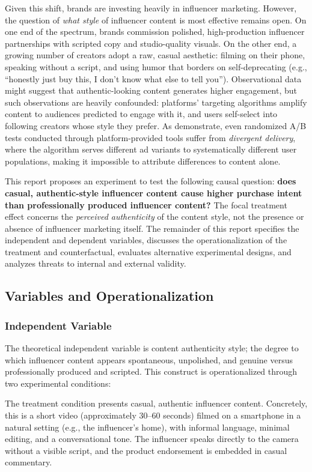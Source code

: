 \documentclass[10pt]{article}
\begin{document}
Given this shift, brands are investing heavily in influencer marketing. However, the question of \textit{what style} of influencer content is most effective remains open. On one end of the spectrum, brands commission polished, high-production influencer partnerships with scripted copy and studio-quality visuals. On the other end, a growing number of creators adopt a raw, casual aesthetic: filming on their phone, speaking without a script, and using humor that borders on self-deprecating (e.g., ``honestly just buy this, I don't know what else to tell you''). Observational data might suggest that authentic-looking content generates higher engagement, but such observations are heavily confounded: platforms' targeting algorithms amplify content to audiences predicted to engage with it, and users self-select into following creators whose style they prefer. As \textcite{braun2025abtesting} demonstrate, even randomized A/B tests conducted through platform-provided tools suffer from \textit{divergent delivery}, where the algorithm serves different ad variants to systematically different user populations, making it impossible to attribute differences to content alone.

This report proposes an experiment to test the following causal question: \textbf{does casual, authentic-style influencer content cause higher purchase intent than professionally produced influencer content?} The focal treatment effect concerns the \textit{perceived authenticity} of the content style, not the presence or absence of influencer marketing itself. The remainder of this report specifies the independent and dependent variables, discusses the operationalization of the treatment and counterfactual, evaluates alternative experimental designs, and analyzes threats to internal and external validity.

\subsection{Variables and Operationalization}
\subsubsection{Independent Variable}
The theoretical independent variable is content authenticity style; the degree to which influencer content appears spontaneous, unpolished, and genuine versus professionally produced and scripted. This construct is operationalized through two experimental conditions:

The treatment condition presents casual, authentic influencer content. Concretely, this is a short video (approximately 30--60 seconds) filmed on a smartphone in a natural setting (e.g., the influencer's home), with informal language, minimal editing, and a conversational tone. The influencer speaks directly to the camera without a visible script, and the product endorsement is embedded in casual commentary.
\end{document}
